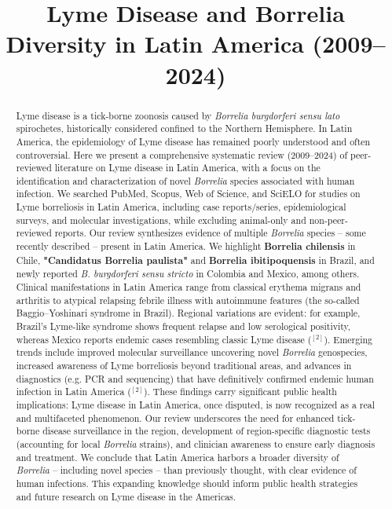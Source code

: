 \documentclass[11pt,letterpaper]{article}
\title{\vspace{-1.5cm}\Large\bfseries\color{accentblue} Lyme Disease and Borrelia Diversity in Latin America (2009–2024)}
\author{}
\date{}
\newcommand{\mycite}[1]{$^{[#1]}$}
\newenvironment{abstractenv}{%
  \begin{mdframed}[linewidth=0.5pt,linecolor=black,backgroundcolor=lightgray,innerleftmargin=10pt,innerrightmargin=10pt,innertopmargin=8pt,innerbottommargin=8pt]
  \begin{abstract}\setstretch{1.05}\noindent}
  {\end{abstract}\end{mdframed}}
\begin{document}
\maketitle
\thispagestyle{fancy}

\begin{abstractenv}
Lyme disease is a tick-borne zoonosis caused by \textit{Borrelia burgdorferi sensu lato} spirochetes, historically considered confined to the Northern Hemisphere. In Latin America, the epidemiology of Lyme disease has remained poorly understood and often controversial. Here we present a comprehensive systematic review (2009–2024) of peer-reviewed literature on Lyme disease in Latin America, with a focus on the identification and characterization of novel \textit{Borrelia} species associated with human infection. We searched PubMed, Scopus, Web of Science, and SciELO for studies on Lyme borreliosis in Latin America, including case reports/series, epidemiological surveys, and molecular investigations, while excluding animal-only and non-peer-reviewed reports. Our review synthesizes evidence of multiple \textit{Borrelia} species – some recently described – present in Latin America. We highlight \textbf{Borrelia chilensis} in Chile, \textbf{"Candidatus Borrelia paulista"} and \textbf{Borrelia ibitipoquensis} in Brazil, and newly reported \textit{B. burgdorferi sensu stricto} in Colombia and Mexico, among others. Clinical manifestations in Latin America range from classical erythema migrans and arthritis to atypical relapsing febrile illness with autoimmune features (the so-called Baggio–Yoshinari syndrome in Brazil). Regional variations are evident: for example, Brazil's Lyme-like syndrome shows frequent relapse and low serological positivity, whereas Mexico reports endemic cases resembling classic Lyme disease (\mycite{2}). Emerging trends include improved molecular surveillance uncovering novel \textit{Borrelia} genospecies, increased awareness of Lyme borreliosis beyond traditional areas, and advances in diagnostics (e.g. PCR and sequencing) that have definitively confirmed endemic human infection in Latin America (\mycite{2}). These findings carry significant public health implications: Lyme disease in Latin America, once disputed, is now recognized as a real and multifaceted phenomenon. Our review underscores the need for enhanced tick-borne disease surveillance in the region, development of region-specific diagnostic tests (accounting for local \textit{Borrelia} strains), and clinician awareness to ensure early diagnosis and treatment. We conclude that Latin America harbors a broader diversity of \textit{Borrelia} – including novel species – than previously thought, with clear evidence of human infections. This expanding knowledge should inform public health strategies and future research on Lyme disease in the Americas.
\end{abstractenv}
\end{document}
